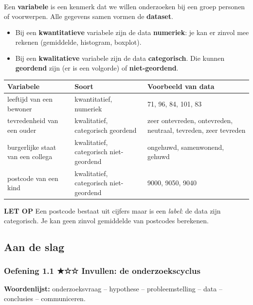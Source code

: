 \begin{theorie}
Een \textbf{variabele} is een kenmerk dat we willen onderzoeken bij een groep personen of voorwerpen. Alle gegevens samen vormen de \textbf{dataset}.

\begin{itemize}
\item Bij een \textbf{kwantitatieve} variabele zijn de data \textbf{numeriek}: je kan er zinvol mee rekenen (gemiddelde, histogram, boxplot).
\item Bij een \textbf{kwalitatieve} variabele zijn de data \textbf{categorisch}. Die kunnen \textbf{geordend} zijn (er is een volgorde) of \textbf{niet-geordend}.
\end{itemize}

\begin{tabular}{lll}
\hline
Variabele & Soort & Voorbeeld van data \\
\hline
leeftijd van een bewoner & kwantitatief, numeriek & 71, 96, 84, 101, 83 \\
tevredenheid van een ouder & kwalitatief, categorisch geordend & zeer ontevreden, ontevreden, neutraal, tevreden, zeer tevreden \\
burgerlijke staat van een collega & kwalitatief, categorisch niet-geordend & ongehuwd, samenwonend, gehuwd \\
postcode van een kind & kwalitatief, categorisch niet-geordend & 9000, 9050, 9040 \\
\hline
\end{tabular}
\end{theorie}

\begin{letop}
\textbf{LET OP} \quad Een postcode bestaat uit cijfers maar is een \emph{label}: de data zijn categorisch. Je kan geen zinvol gemiddelde van postcodes berekenen.
\end{letop}

\subsection*{Aan de slag}

\subsubsection*{Oefening 1.1 \quad ★☆☆ \quad Invullen: de onderzoekscyclus}

\textbf{Woordenlijst:} onderzoeksvraag – hypothese – probleemstelling – data – conclusies – communiceren.

